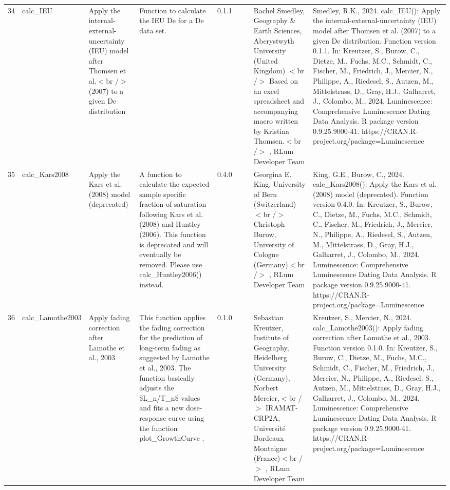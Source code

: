 \begin{table}[ht]
\begin{tabular}{rllllllll}
 \\ 
  34 & calc\_IEU & Apply the internal-external-uncertainty (IEU) model after Thomsen et al.$<$br /$>$ (2007) to a given De distribution & Function to calculate the IEU De for a De data set. & 0.1.1
 &  &  & Rachel Smedley, Geography \& Earth Sciences, Aberystwyth University (United Kingdom)  $<$br /$>$ Based on an excel spreadsheet and accompanying macro written by Kristina Thomsen.$<$br /$>$ , RLum Developer Team & Smedley, R.K., 2024. calc\_IEU(): Apply the internal-external-uncertainty (IEU) model after Thomsen et al. (2007) to a given De distribution. Function version 0.1.1. In: Kreutzer, S., Burow, C., Dietze, M., Fuchs, M.C., Schmidt, C., Fischer, M., Friedrich, J., Mercier, N., Philippe, A., Riedesel, S., Autzen, M., Mittelstrass, D., Gray, H.J., Galharret, J., Colombo, M., 2024. Luminescence: Comprehensive Luminescence Dating Data Analysis. R package version 0.9.25.9000-41. https://CRAN.R-project.org/package=Luminescence
 \\ 
  35 & calc\_Kars2008 & Apply the Kars et al. (2008) model (deprecated) & A function to calculate the expected sample specific fraction of saturation following Kars et al. (2008) and Huntley (2006). This function is deprecated and will eventually be removed. Please use  calc\_Huntley2006()  instead. & 0.4.0
 &  &  & Georgina E. King, University of Bern (Switzerland)  $<$br /$>$ Christoph Burow, University of Cologne (Germany)$<$br /$>$ , RLum Developer Team & King, G.E., Burow, C., 2024. calc\_Kars2008(): Apply the Kars et al. (2008) model (deprecated). Function version 0.4.0. In: Kreutzer, S., Burow, C., Dietze, M., Fuchs, M.C., Schmidt, C., Fischer, M., Friedrich, J., Mercier, N., Philippe, A., Riedesel, S., Autzen, M., Mittelstrass, D., Gray, H.J., Galharret, J., Colombo, M., 2024. Luminescence: Comprehensive Luminescence Dating Data Analysis. R package version 0.9.25.9000-41. https://CRAN.R-project.org/package=Luminescence
 \\ 
  36 & calc\_Lamothe2003 & Apply fading correction after Lamothe et al., 2003 & This function applies the fading correction for the prediction of long-term fading as suggested by Lamothe et al., 2003. The function basically adjusts the \$L\_n/T\_n\$ values and fits a new dose-response curve using the function  plot\_GrowthCurve . & 0.1.0
 &  &  & Sebastian Kreutzer, Institute of Geography, Heidelberg University (Germany), Norbert Mercier,$<$br /$>$ IRAMAT-CRP2A, Université Bordeaux Montaigne (France)$<$br /$>$ , RLum Developer Team & Kreutzer, S., Mercier, N., 2024. calc\_Lamothe2003(): Apply fading correction after Lamothe et al., 2003. Function version 0.1.0. In: Kreutzer, S., Burow, C., Dietze, M., Fuchs, M.C., Schmidt, C., Fischer, M., Friedrich, J., Mercier, N., Philippe, A., Riedesel, S., Autzen, M., Mittelstrass, D., Gray, H.J., Galharret, J., Colombo, M., 2024. Luminescence: Comprehensive Luminescence Dating Data Analysis. R package version 0.9.25.9000-41. https://CRAN.R-project.org/package=Luminescence

\end{tabular}
\end{table}
